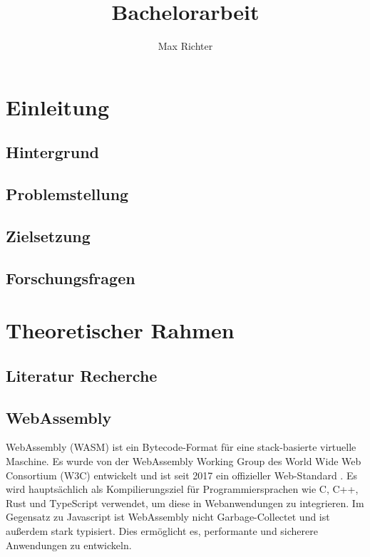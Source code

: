 \documentclass[ngerman]{article}
\title{Bachelorarbeit}
\author{Max Richter}
\begin{document}
\pagestyle{fancy}
\fancyhead{} %
\fancyfoot{} %
\fancyfoot[LE,RO]{\thepage}

\raggedright

\maketitle
\pagebreak

\tableofcontents

\pagebreak

\section{Einleitung}
\subsection{Hintergrund}
\subsection{Problemstellung}
\subsection{Zielsetzung}
\subsection{Forschungsfragen}

\section{Theoretischer Rahmen}
\subsection{Literatur Recherche}
\subsection{WebAssembly}
WebAssembly (WASM) ist ein Bytecode-Format für eine stack-basierte virtuelle Maschine. Es wurde von der WebAssembly Working Group des World Wide Web Consortium (W3C) entwickelt und ist seit 2017 ein offizieller Web-Standard \cite{Haas2017}.
\linebreak
\linebreak
Es wird hauptsächlich als Kompilierungsziel für Programmiersprachen wie C, C++, Rust und TypeScript verwendet, um diese in Webanwendungen zu integrieren. Im Gegensatz zu Javascript ist WebAssembly nicht Garbage-Collectet und ist außerdem stark typisiert. Dies ermöglicht es, performante und sicherere Anwendungen zu entwickeln.
\end{document}
